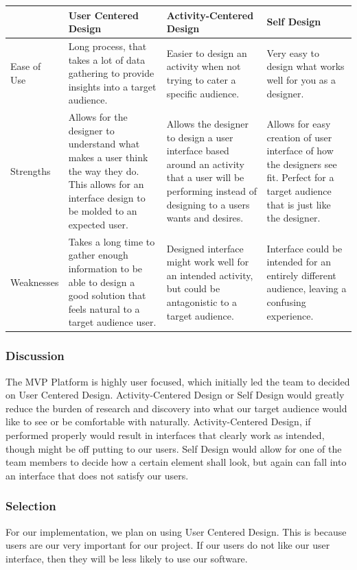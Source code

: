 \documentclass[onecolumn, draftclsnofoot,10pt, compsoc]{IEEEtran}
\begin{document}
{\tablehead{}
\begin{supertabular}{|p{2.5cm}|p{4.5cm}|p{4.5cm}|p{4.5cm}|}
\hline
	& User Centered Design
	& Activity-Centered Design
	& Self Design\\
\hline
	Ease of Use
	& Long process, that takes a lot of data gathering to provide insights into a target audience.
	& Easier to design an activity when not trying to cater a specific audience.
	& Very easy to design what works well for you as a designer. \\
\hline
	Strengths
	& Allows for the designer to understand what makes a user think the way they do.
		This allows for an interface design to be molded to an expected user.
	& Allows the designer to design a user interface based around an activity that
		a user will be performing instead of designing to a users wants and desires.
	& Allows for easy creation of user interface of how the designers see fit.
		Perfect for a target audience that is just like the designer. \\
\hline
	Weaknesses
	& Takes a long time to gather enough information to be able to design a
		good solution that feels natural to a target audience user.
	& Designed interface might work well for an intended activity, but could
		be antagonistic to a target audience.
	& Interface could be intended for an entirely different audience,
		leaving a confusing experience.\\
\hline

\end{supertabular}

\medskip

\subsubsection{Discussion}
\noindent The MVP Platform is highly user focused, which initially led the team to decided on User Centered Design. Activity-Centered Design or Self Design would greatly reduce the burden of research and discovery into what our target audience would like to see or be comfortable with naturally. Activity-Centered Design, if performed properly would result in interfaces that clearly work as intended, though might be off putting to our users. Self Design would allow for one of the team members to decide how a certain element shall look, but again can fall into an interface that does not satisfy our users.

\medskip
\subsubsection{Selection}
\noindent For our implementation, we plan on using User Centered Design. This is because users are our very important for our project. If our users do not like our user interface, then they will be less likely to use our software.








}
\end{document}
